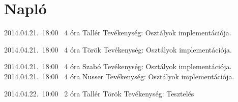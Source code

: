%
\section{Napló}

\begin{naplo}

\bejegyzes
{2014.04.21.~18:00~} %
{4 óra} %
{Tallér} %
{Tevékenység: Osztályok implementációja.} %

\bejegyzes
{2014.04.21.~18:00~} %
{4 óra} %
{Török} %
{Tevékenység: Osztályok implementációja.} %

\bejegyzes
{2014.04.21.~18:00~} %
{4 óra} %
{Szabó} %
{Tevékenység: Osztályok implementációja.} %
\bejegyzes
{2014.04.21.~18:00~} %
{4 óra} %
{Nusser} %
{Tevékenység: Osztályok implementációja.} %

\bejegyzes
{2014.04.22.~10:00~} %
{2 óra} %
{Tallér \newline
Török} %
{Tevékenység: Tesztelés}


\end{naplo}


